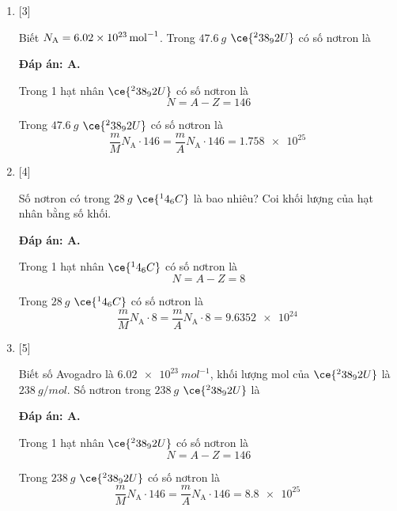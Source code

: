 \begin{enumerate}[label=\bfseries Câu \arabic*:]
{	}
	\item {} [3]
	\cauhoi
	{Biết $N_\text A = \SI{6.02e23}{mol^{-1}}$. Trong $\SI{47.6}{g}$ $\ce{^238_92 U}$ có số nơtron là 
	}
	
	\loigiai
	{		\textbf{Đáp án: A.}
		
		Trong 1 hạt nhân $\ce{^238_92 U}$ có số nơtron là
		$$N=A-Z=146$$
		
		Trong $\SI{47.6}{g}$ $\ce{^238_92 U}$ có số nơtron là
		$$\dfrac{m}{M} N_\text{A} \cdot 146 = \dfrac{m}{A} N_\text{A} \cdot 146 = \SI{1.758e25}{}$$
		
	}
	
	
	
	\item {} [4]
	\cauhoi
	{Số nơtron có trong $\SI{28}{g}$ $\ce{^14_6 C}$ là bao nhiêu? Coi khối lượng của hạt nhân bằng số khối.
	}
	
	\loigiai
	{		\textbf{Đáp án: A.}
		
		Trong 1 hạt nhân $\ce{^14_6 C}$ có số nơtron là
		$$N=A-Z=8$$
		
		Trong $\SI{28}{g}$ $\ce{^14_6 C}$ có số nơtron là
		$$\dfrac{m}{M} N_\text{A} \cdot 8 = \dfrac{m}{A} N_\text{A} \cdot 8 = \SI{9.6352e24}{}$$
		
	}
	
	
	
	\item {} [5]
	\cauhoi
	{Biết số Avogadro là $\SI{6.02e23}{mol^{-1}}$, khối lượng mol của $\ce{^238_92 U}$ là $\SI{238}{g/mol}$. Số nơtron trong $\SI{238}{g}$ $\ce{^238_92 U}$ là
	}
	
	\loigiai
	{		\textbf{Đáp án: A.}
		
		Trong 1 hạt nhân $\ce{^238_92 U}$ có số nơtron là
		$$N=A-Z=146$$
		
		Trong $\SI{238}{g}$ $\ce{^238_92 U}$ có số nơtron là
		$$\dfrac{m}{M} N_\text{A} \cdot 146 = \dfrac{m}{A} N_\text{A} \cdot 146 = \SI{8.8e25}{}$$
		
	}
	
	
\end{enumerate}

